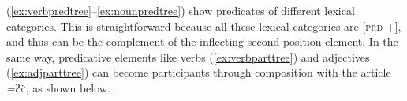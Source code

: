 


(\ref{ex:verbpredtree}--\ref{ex:nounpredtree}) show predicates of different lexical categories. This is straightforward because all these lexical categories are [\textsc{prd} +], and thus can be the complement of the inflecting second-position element. In the same way, predicative elements like verbs (\ref{ex:verbparttree}) and adjectives (\ref{ex:adjparttree}) can become participants through composition with the article \textit{=ʔiˑ}, as shown below.

